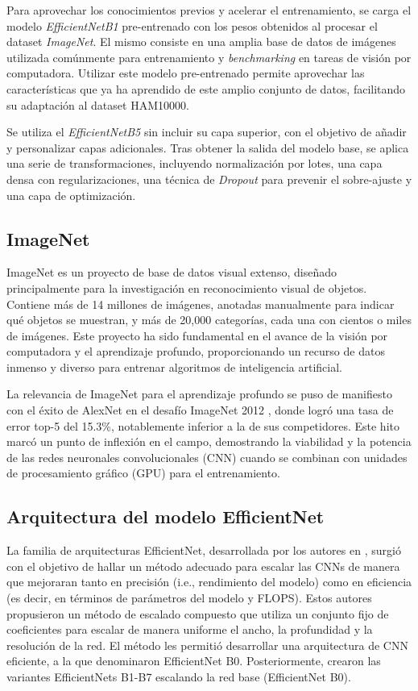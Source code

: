 Para aprovechar los conocimientos previos y acelerar el entrenamiento, se carga el modelo \textit{EfficientNetB1} pre-entrenado con los pesos obtenidos al procesar el dataset \textit{ImageNet}. El mismo consiste en una amplia base de datos de imágenes utilizada comúnmente para entrenamiento y \textit{benchmarking} en tareas de visión por computadora. Utilizar este modelo pre-entrenado permite aprovechar las características que ya ha aprendido de este amplio conjunto de datos, facilitando su adaptación al dataset HAM10000.

Se utiliza el \textit{EfficientNetB5} sin incluir su capa superior, con el objetivo de añadir y personalizar capas adicionales. Tras obtener la salida del modelo base, se aplica una serie de transformaciones, incluyendo normalización por lotes, una capa densa con regularizaciones, una técnica de \textit{Dropout} para prevenir el sobre-ajuste y una capa de optimización. 

\subsection{ImageNet}

ImageNet es un proyecto de base de datos visual extenso, diseñado principalmente para la investigación en reconocimiento visual de objetos. Contiene más de 14 millones de imágenes, anotadas manualmente para indicar qué objetos se muestran, y más de 20,000 categorías, cada una con cientos o miles de imágenes. Este proyecto ha sido fundamental en el avance de la visión por computadora y el aprendizaje profundo, proporcionando un recurso de datos inmenso y diverso para entrenar algoritmos de inteligencia artificial.

La relevancia de ImageNet para el aprendizaje profundo se puso de manifiesto con el éxito de AlexNet en el desafío ImageNet 2012 , donde logró una tasa de error top-5 del 15.3\%, notablemente inferior a la de sus competidores. Este hito marcó un punto de inflexión en el campo, demostrando la viabilidad y la potencia de las redes neuronales convolucionales (CNN) cuando se combinan con unidades de procesamiento gráfico (GPU) para el entrenamiento.

\subsection{Arquitectura del modelo EfficientNet}

La familia de arquitecturas EfficientNet, desarrollada por los autores en , surgió con el objetivo de hallar un método adecuado para escalar las CNNs de manera que mejoraran tanto en precisión (i.e., rendimiento del modelo) como en eficiencia (es decir, en términos de parámetros del modelo y FLOPS). Estos autores propusieron un método de escalado compuesto que utiliza un conjunto fijo de coeficientes para escalar de manera uniforme el ancho, la profundidad y la resolución de la red. El método les permitió desarrollar una arquitectura de CNN eficiente, a la que denominaron EfficientNet B0. Posteriormente, crearon las variantes EfficientNets B1-B7 escalando la red base (EfficientNet B0).

